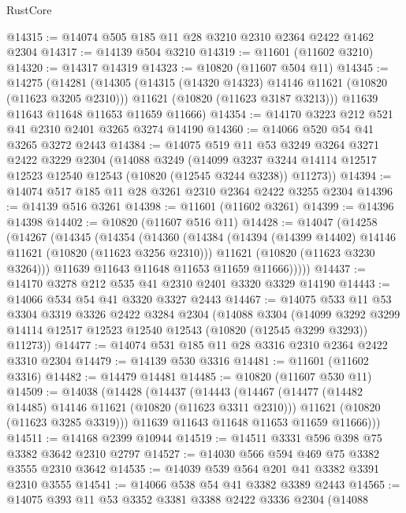 \begin{lexlean}{RustCore}
\begin{coremodule}
@14315 := @14074 @505 @185 @11 @28 @3210 @2310 @2364 @2422 @1462 @2304
@14317 := @14139 @504 @3210
@14319 := @11601 (@11602 @3210)
@14320 := @14317 @14319
@14323 := @10820 (@11607 @504 @11)
@14345 := @14275
    (@14281
      (@14305
        (@14315 (@14320 @14323) @14146 @11621 (@10820 (@11623 @3205 @2310)))
        @11621
        (@10820 (@11623 @3187 @3213)))
      @11639
      @11643
      @11648
      @11653
      @11659
      @11666)
@14354 := @14170 @3223 @212 @521 @41 @2310 @2401 @3265 @3274 @14190
@14360 := @14066 @520 @54 @41 @3265 @3272 @2443
@14384 := @14075
    @519
    @11
    @53
    @3249
    @3264
    @3271
    @2422
    @3229
    @2304
    (@14088
      @3249
      (@14099 @3237 @3244 @14114 @12517 @12523 @12540 @12543 (@10820 (@12545 @3244 @3238)) @11273))
@14394 := @14074 @517 @185 @11 @28 @3261 @2310 @2364 @2422 @3255 @2304
@14396 := @14139 @516 @3261
@14398 := @11601 (@11602 @3261)
@14399 := @14396 @14398
@14402 := @10820 (@11607 @516 @11)
@14428 := @14047
    (@14258
      (@14267
        (@14345
          (@14354
            (@14360
              (@14384
                (@14394 (@14399 @14402) @14146 @11621 (@10820 (@11623 @3256 @2310)))
                @11621
                (@10820 (@11623 @3230 @3264)))
              @11639
              @11643
              @11648
              @11653
              @11659
              @11666)))))
@14437 := @14170 @3278 @212 @535 @41 @2310 @2401 @3320 @3329 @14190
@14443 := @14066 @534 @54 @41 @3320 @3327 @2443
@14467 := @14075
    @533
    @11
    @53
    @3304
    @3319
    @3326
    @2422
    @3284
    @2304
    (@14088
      @3304
      (@14099 @3292 @3299 @14114 @12517 @12523 @12540 @12543 (@10820 (@12545 @3299 @3293)) @11273))
@14477 := @14074 @531 @185 @11 @28 @3316 @2310 @2364 @2422 @3310 @2304
@14479 := @14139 @530 @3316
@14481 := @11601 (@11602 @3316)
@14482 := @14479 @14481
@14485 := @10820 (@11607 @530 @11)
@14509 := @14038
    (@14428
      (@14437
        (@14443
          (@14467
            (@14477 (@14482 @14485) @14146 @11621 (@10820 (@11623 @3311 @2310)))
            @11621
            (@10820 (@11623 @3285 @3319)))
          @11639
          @11643
          @11648
          @11653
          @11659
          @11666)))
@14511 := @14168 @2399 @10944
@14519 := @14511 @3331 @596 @398 @75 @3382 @3642 @2310 @2797
@14527 := @14030 @566 @594 @469 @75 @3382 @3555 @2310 @3642
@14535 := @14039 @539 @564 @201 @41 @3382 @3391 @2310 @3555
@14541 := @14066 @538 @54 @41 @3382 @3389 @2443
@14565 := @14075
    @393
    @11
    @53
    @3352
    @3381
    @3388
    @2422
    @3336
    @2304
    (@14088

\end{coremodule}
\end{lexlean}
